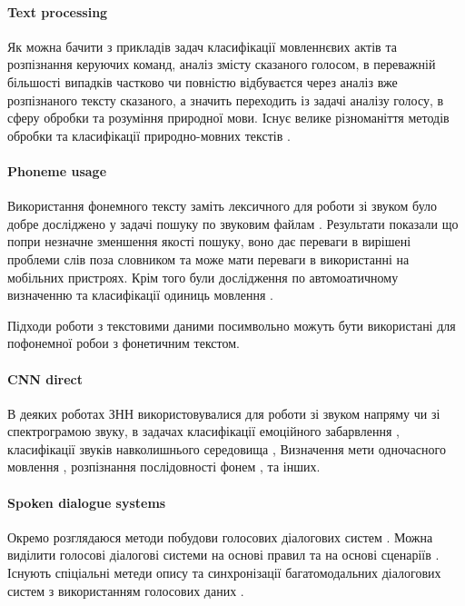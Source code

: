 \paragraph{Text processing}

Як можна бачити з прикладів задач класифікації мовленнєвих актів та розпізнання керуючих команд, аналіз змісту сказаного голосом, в переважній більшості випадків частково чи повністю відбуваєтся через аналіз вже розпізнаного тексту сказаного, а значить переходить із задачі аналізу голосу, в сферу обробки та розуміння природної мови. Існує велике різноманіття методів обробки та класифікації природно-мовних текстів \cite{Mironczuk_2018,Altinel_2018,Hartmann_2018,Kim_2014,Britz_2015_2,Britz_2015,Marchenko_2005}.

\paragraph{Phoneme usage}

Використання фонемного тексту заміть лексичного для роботи зі звуком було добре досліджено у задачі пошуку по звуковим файлам \cite{Ng_C_2000,Ng_K_2000,Witbrock_1997}. Результати показали що попри незначне зменшення якості пошуку, воно дає переваги в вирішені проблеми слів поза словником та може мати переваги в використанні на мобільних пристроях. Крім того були дослідження по автомоатичному визначенню та класифікації одиниць мовлення \cite{Sharma_2018}.

Підходи роботи з текстовими даними посимвольно \cite{Kim_2016,Zhang_2015_2,Zhang_2015,Santos_2014} можуть бути використані для пофонемної робои з фонетичним текстом.

\paragraph{CNN direct}

В деяких роботах ЗНН використовувалися для роботи зі звуком напряму чи зі спектрограмою звуку, в задачах класифікації емоційного забарвлення \cite{Weisskirchen_2017}, класифікації звуків навколишнього середовища \cite{Boddapati_2017}, Визначення мети одночасного мовлення \cite{Chowdhury_2018}, розпізнання послідовності фонем \cite{Abdel_2012,Zhang_2017}, та інших.

\paragraph{Spoken dialogue systems}

Окремо розглядаюся методи побудови голосових діалогових систем \cite{Iosif_2018}. Можна виділити голосові діалогові системи на основі правил \cite{Herbert_2018,Lopes_2015} та на основі сценаріїв \cite{Lopez_2016,Khouzaimi_2018}. Існують спіціальні метеди опису та синхронізації багатомодальних діалогових систем з використанням голосових даних \cite{Katsurada_2003,Karpov_2012}. 

